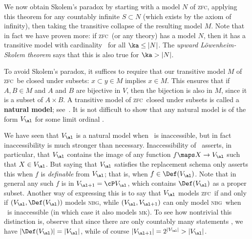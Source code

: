 \documentclass{amsart}
\def\zfc{\textsc{zfc}}
\def\nbg{\textsc{nbg}}
\def\mk{\textsc{mk}}
\begin{document}
We now obtain Skolem's paradox by starting with a model $N$ of \zfc,
applying this theorem for any countably infinite $S\subset N$ (which
exists by the axiom of infinity), then taking the transitive collapse
of the resulting model $M$.  Note that in fact we have proven more: if
\zfc\ (or any theory) has a model $N$, then it has a transitive model
with cardinality \ka\ for all $\ka\le|N|$.  The \emph{upward
  L\"owenheim-Skolem theorem} says that this is also true for $\ka
>|N|$.

To avoid Skolem's paradox, it suffices to require that our transitive
model $M$ of \zfc\ be closed under subsets: $x\subset y\in M$ implies
$x\in M$.  This ensures that if $A,B\in M$ and $A$ and $B$ are
bijective in $V$, then the bijection is also in $M$, since it is a
subset of $A\times B$.  A transitive model of \zfc\ closed
under subsets is called a \textbf{natural model}; see~\cite{mv:nmod}.
It is not difficult to show that any natural model is of the form
$V_\al$ for some limit ordinal \al.

We have seen that $V_\al$ is a natural model when \al\ is
inaccessible, but in fact inaccessibility is much stronger than
necessary.  Inaccessibility of \al\ asserts, in particular, that
$V_\al$ contains the image of any function $f\maps X\to V_\al$ such
that $X\in V_\al$.  But saying that $V_\al$ satisfies the replacement
schema only asserts this when $f$ is \emph{definable} from $V_\al$;
that is, when $f\in\Def(V_\al)$.  Note that in general any such $f$ is
in $V_{\al+1}=\cP V_\al$, which contains $\Def(V_\al)$ as a proper
subset.  Another way of expressing this is to say that $V_\al$ models
\zfc\ if and only if $(V_\al,\Def(V_\al))$ models \nbg, while
$(V_\al,V_{\al+1})$ can only model \nbg\ when \al\ is inaccessible (in
which case it also models \mk).  To see how nontrivial this
distinction is, observe that since there are only countably many
statements \ph, we have $|\Def(V_\al)| = |V_\al|$, while of course
$|V_{\al+1}| = 2^{|V_\al|} > |V_\al|$.

\end{document}

